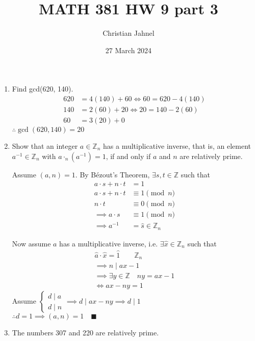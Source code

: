 \documentclass[letterpaper, 12pt]{article}
\title{MATH 381 HW 9 part 3}
\author{Christian Jahnel}
\date{27 March 2024}
\newcommand{\qed}{\quad \blacksquare}
\newcommand{\Z}{\mathbb{Z}}
\newcommand{\0}{\emptyset}
\begin{document}
\maketitle
\begin{enumerate}
\item Find gcd(620, 140).
\begin{align*}
    620 &= 4(140) + 60 \iff 60 = 620 - 4(140) \\
    140 &= 2(60) + 20 \iff 20 = 140 - 2(60) \\
    60 &= 3(20) + 0
\end{align*}
$\therefore \gcd(620, 140) = 20$
\item Show that an integer $a \in \Z_n$ has a multiplicative inverse, that is, an element 
$a^{-1} \in \Z_n$ with $a \cdot_n (a^{-1}) = 1$, if and only if $a$ and $n$ are relatively prime.
\begin{flushleft}
    Assume $(a,n) = 1$.
    By Bézout's Theorem, $\exists s, t \in \Z$ such that
    \begin{align*}
        a \cdot s + n \cdot t &= 1 \\
        a \cdot s + n \cdot t &\equiv 1 \pmod n \\
        n \cdot t &\equiv 0 \pmod n \\
        \implies a \cdot s &\equiv 1 \pmod n \\
        \implies a^{-1} &= \hat{s} \in \Z_n
    \end{align*}
\end{flushleft}
\begin{flushleft}
    Now assume $a$ has a multiplicative inverse, i.e. $\exists \hat{x} \in \Z_n$ such that
    \begin{gather*}
        \hat{a} \cdot \hat{x} = \hat{1} \qquad \Z_n \\
        \implies n \mid ax-1 \\
        \implies \exists y \in \Z \quad ny = ax - 1 \\
        \iff ax-ny = 1
    \end{gather*}
    Assume $\begin{cases}
        d \mid a \\
        d \mid n
    \end{cases} \implies d \mid ax - ny \implies d \mid 1$ \\
    $\therefore d = 1 \implies (a, n) = 1 \qed$
\end{flushleft}
\item The numbers 307 and 220 are relatively prime.
\begin{enumerate}

\end{enumerate}
\end{enumerate}
\end{document}
